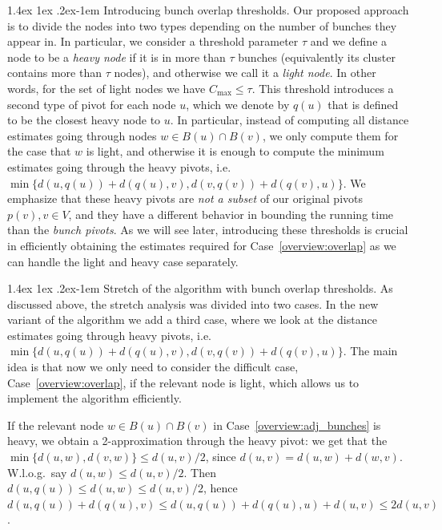 \documentclass[11pt]{article}
\makeatletter
\theoremstyle{definition}
\theoremstyle{remark}
\renewcommand{\paragraph}{%
  \@startsection{paragraph}{4}%
  {\z@}{1.4ex \@plus 1ex \@minus .2ex}{-1em}%
  {\normalfont\normalsize\bfseries}%
}
\makeatother
\begin{document}
\paragraph{Introducing bunch overlap thresholds.} Our proposed approach is to divide the nodes into two types depending on the number of bunches they appear in.
In particular, we consider a threshold parameter $\tau$ and we define a node to be a \textit{heavy node} if it is in more than $\tau$ bunches (equivalently its cluster contains more than $ \tau $ nodes), and otherwise we call it a \textit{light node}. In other words, for the set of light nodes we have $C_{\max}\leq \tau$. This threshold introduces a second type of pivot for each node $u$, which we denote by $q(u)$ that is defined to be the closest heavy node to $u$. In particular, instead of computing all distance estimates going through nodes $w \in B(u) \cap B(v)$, we only compute them for the case that $w$ is light, and otherwise it is enough to compute the minimum estimates going through the heavy pivots, i.e.~$\min \{ d(u,q(u))+d(q(u),v), d(v,q(v))+d(q(v),u)\}$. We emphasize that these heavy pivots are \textit{not a subset} of our original pivots $p(v), v \in V$, and they have a different behavior in bounding the running time than the \textit{bunch pivots}.
 As we will see later, introducing these thresholds is crucial in efficiently obtaining the estimates required for Case~\ref{overview:overlap} as we can handle the light and heavy case separately.


\paragraph{Stretch of the algorithm with bunch overlap thresholds.} As discussed above, the stretch analysis was divided into two cases. In the new variant of the algorithm we add a third case, where we look at the distance estimates going through heavy pivots, i.e.~$\min \{ d(u,q(u))+d(q(u),v), d(v,q(v))+d(q(v),u)\}$. The main idea is that now we only need to consider the difficult case, Case~\ref{overview:overlap}, if the relevant node is light, which allows us to implement the algorithm efficiently. 

If the relevant node $w\in B(u)\cap B(v)$ in Case~\ref{overview:adj_bunches} is heavy, we obtain a 2-approximation through the heavy pivot: we get that the $\min\{d(u,w),d(v,w)\} \leq d(u,v)/2$, since $d(u,v)= d(u,w)+d(w,v)$. W.l.o.g.\ say $d(u,w)\leq d(u,v)/2$. Then $d(u,q(u))\leq d(u,w)\leq d(u,v)/2$, hence $d(u,q(u))+d(q(u),v)\leq d(u,q(u))+d(q(u),u)+d(u,v) \leq 2d(u,v)$. 
\end{document}
